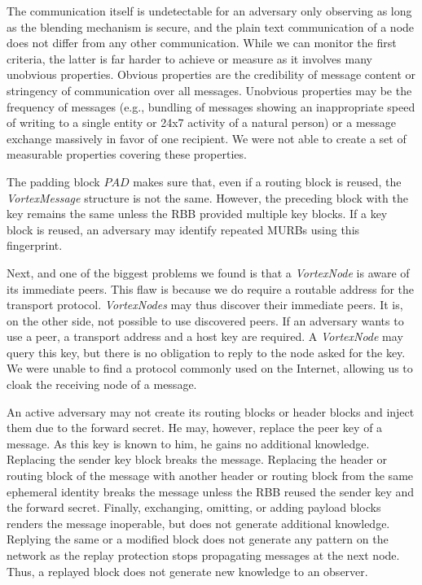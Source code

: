 \documentclass[acmsmall, screen]{acmart}
\begin{document}
The communication itself is undetectable for an adversary only observing as long as the blending mechanism is secure, and the plain text communication of a node does not differ from any other communication. While we can monitor the first criteria, the latter is far harder to achieve or measure as it involves many unobvious properties. Obvious properties are the credibility of message content or stringency of communication over all messages. Unobvious properties may be the frequency of messages (e.g., bundling of messages showing an inappropriate speed of writing to a single entity or 24x7 activity of a natural person) or a message exchange massively in favor of one recipient. We were not able to create a set of measurable properties covering these properties.

The padding block $PAD$ makes sure that, even if a routing block is reused, the \emph{VortexMessage} structure is not the same. However, the preceding block with the key remains the same unless the RBB provided multiple key blocks. If a key block is reused, an adversary may identify repeated MURBs using this fingerprint.


Next, and one of the biggest problems we found is that a \emph{VortexNode} is aware of its immediate peers. This flaw is because we do require a routable address for the transport protocol. \emph{VortexNodes} may thus discover their immediate peers. It is, on the other side, not possible to use discovered peers. If an adversary wants to use a peer, a transport address and a host key are required. A \emph{VortexNode} may query this key, but there is no obligation to reply to the node asked for the key. We were unable to find a protocol commonly used on the Internet, allowing us to cloak the receiving node of a message.

An active adversary may not create its routing blocks or header blocks and inject them due to the forward secret. He may, however, replace the peer key of a message. As this key is known to him, he gains no additional knowledge. Replacing the sender key block breaks the message. Replacing the header or routing block of the message with another header or routing block from the same ephemeral identity breaks the message unless the RBB reused the sender key and the forward secret. Finally, exchanging, omitting, or adding payload blocks renders the message inoperable, but does not generate additional knowledge. Replying the same or a modified block does not generate any pattern on the network as the replay protection stops propagating messages at the next node. Thus, a replayed block does not generate new knowledge to an observer.
\end{document}
